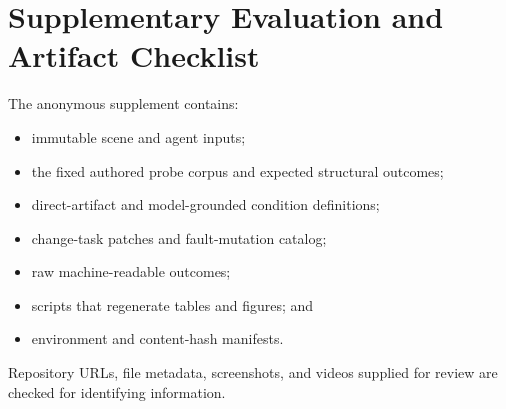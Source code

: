 \clearpage
\section{Supplementary Evaluation and Artifact Checklist}

The anonymous supplement contains:

\begin{itemize}
  \item immutable scene and agent inputs;
  \item the fixed authored probe corpus and expected structural outcomes;
  \item direct-artifact and model-grounded condition definitions;
  \item change-task patches and fault-mutation catalog;
  \item raw machine-readable outcomes;
  \item scripts that regenerate tables and figures; and
  \item environment and content-hash manifests.
\end{itemize}

Repository URLs, file metadata, screenshots, and videos supplied for review are
checked for identifying information.
